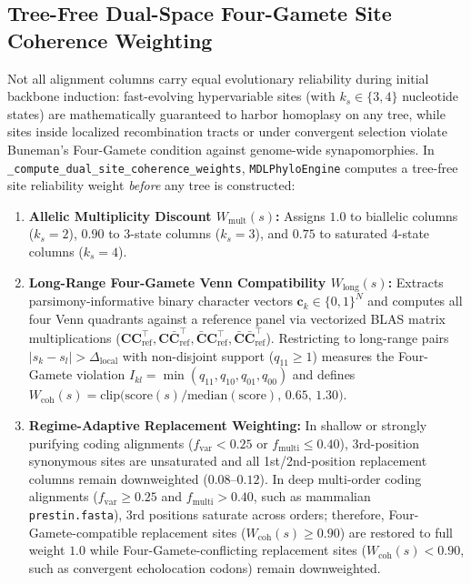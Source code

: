 \documentclass[11pt,a4paper]{article}
\begin{document}
\subsection{Tree-Free Dual-Space Four-Gamete Site Coherence Weighting}

Not all alignment columns carry equal evolutionary reliability during initial backbone induction: fast-evolving hypervariable sites (with $k_s \in \{3,4\}$ nucleotide states) are mathematically guaranteed to harbor homoplasy on any tree, while sites inside localized recombination tracts or under convergent selection violate Buneman's Four-Gamete condition against genome-wide synapomorphies. In \texttt{\_compute\_dual\_site\_coherence\_weights}, \texttt{MDLPhyloEngine} computes a tree-free site reliability weight \emph{before} any tree is constructed:
\begin{enumerate}[leftmargin=1.8em]
    \item \textbf{Allelic Multiplicity Discount $W_{\text{mult}}(s)$:} Assigns $1.0$ to biallelic columns ($k_s = 2$), $0.90$ to 3-state columns ($k_s = 3$), and $0.75$ to saturated 4-state columns ($k_s = 4$).
    \item \textbf{Long-Range Four-Gamete Venn Compatibility $W_{\text{long}}(s)$:} Extracts parsimony-informative binary character vectors $\mathbf{c}_k \in \{0,1\}^N$ and computes all four Venn quadrants against a reference panel via vectorized BLAS matrix multiplications ($\mathbf{C}\mathbf{C}_{\text{ref}}^\top, \mathbf{C}\bar{\mathbf{C}}_{\text{ref}}^\top, \bar{\mathbf{C}}\mathbf{C}_{\text{ref}}^\top, \bar{\mathbf{C}}\bar{\mathbf{C}}_{\text{ref}}^\top$). Restricting to long-range pairs $|s_k - s_l| > \Delta_{\text{local}}$ with non-disjoint support ($q_{11} \ge 1$) measures the Four-Gamete violation $I_{kl} = \min(q_{11}, q_{10}, q_{01}, q_{00})$ and defines $W_{\text{coh}}(s) = \text{clip}\big(\text{score}(s)/\text{median}(\text{score}),\, 0.65,\, 1.30\big)$.
    \item \textbf{Regime-Adaptive Replacement Weighting:} In shallow or strongly purifying coding alignments ($f_{\text{var}} < 0.25$ or $f_{\text{multi}} \le 0.40$), 3rd-position synonymous sites are unsaturated and all 1st/2nd-position replacement columns remain downweighted ($0.08\text{--}0.12$). In deep multi-order coding alignments ($f_{\text{var}} \ge 0.25$ and $f_{\text{multi}} > 0.40$, such as mammalian \texttt{prestin.fasta}), 3rd positions saturate across orders; therefore, Four-Gamete-compatible replacement sites ($W_{\text{coh}}(s) \ge 0.90$) are restored to full weight $1.0$ while Four-Gamete-conflicting replacement sites ($W_{\text{coh}}(s) < 0.90$, such as convergent echolocation codons) remain downweighted.
\end{enumerate}
\end{document}
